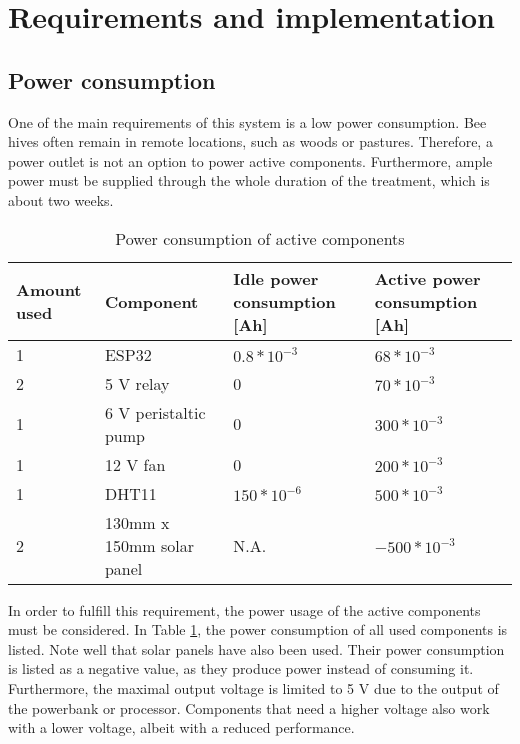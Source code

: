 \section{Requirements and implementation}\label{sec:requirements-and-implementation}

\subsection{Power consumption}\label{subsec:power-consumption}

One of the main requirements of this system is a low power consumption.
Bee hives often remain in remote locations, such as woods or pastures.
Therefore, a power outlet is not an option to power active components.
Furthermore, ample power must be supplied through the whole duration of the treatment, which is about two weeks.

\begin{table}
    \centering
    \caption{Power consumption of active components}
    \label{tab:power-consumption-of-active-components}
    \renewcommand{\arraystretch}{1.2}
    \begin{tabular}{l|l|l|l}
        Amount used & Component & Idle power consumption [Ah] & Active power consumption [Ah] \\
        \hline
        1 & ESP32 &  $0.8 * 10^{-3}$ & $68 * 10^{-3}$ \\
        2 & 5 V relay & 0 & $70 * 10^{-3}$ \\
        1 & 6 V peristaltic pump & 0 & $300 * 10^{-3}$ \\
        1 & 12 V fan & 0 & $200 * 10^{-3} $ \\
        1 & DHT11 & $150 * 10^{-6}$ & $500 * 10^{-3}$ \\
        2 & 130mm x 150mm solar panel & N.A. & $- 500 * 10^{-3}$
    \end{tabular}
\end{table}

In order to fulfill this requirement, the power usage of the active components must be considered.
In Table \ref{tab:power-consumption-of-active-components}, the power consumption of all used components is listed.
Note well that solar panels have also been used.
Their power consumption is listed as a negative value, as they produce power instead of consuming it.
Furthermore, the maximal output voltage is limited to 5 V due to the output of the powerbank or processor.
Components that need a higher voltage also work with a lower voltage, albeit with a reduced performance.

